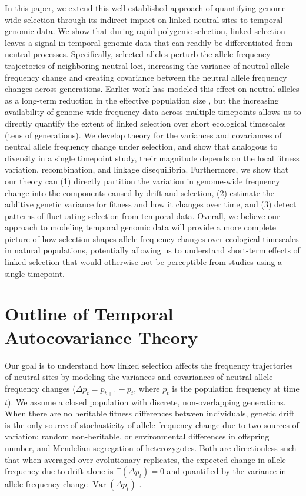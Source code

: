 \documentclass[11pt]{article}
\newcommand{\E}{\mathbb{E}}
\DeclareMathOperator{\var}{Var}
\begin{document}
In this paper, we extend this well-established approach of quantifying
genome-wide selection through its indirect impact on linked neutral sites to
temporal genomic data. We show that during rapid polygenic selection, linked
selection leaves a signal in temporal genomic data that can readily be
differentiated from neutral processes. Specifically, selected alleles perturb
the allele frequency trajectories of neighboring neutral loci, increasing the
variance of neutral allele frequency change and creating covariance between the
neutral allele frequency changes across generations.  Earlier work has modeled
this effect on neutral alleles as a long-term reduction in the effective
population size
\parencite{Robertson1961-ho,Santiago1995-hx,Santiago1998-bs,Wray1990-zf,J_A_Woolliams_N_R_Wray_R_Thompson2008-qo},
but the increasing availability of genome-wide frequency data across multiple
timepoints allows us to directly quantify the extent of linked selection over
short ecological timescales (tens of generations). We develop theory for the
variances and covariances of neutral allele frequency change under selection,
and show that analogous to diversity in a single timepoint study, their
magnitude depends on the local fitness variation, recombination, and linkage
disequilibria. Furthermore, we show that our theory can (1) directly
partition the variation in genome-wide frequency change into the components
caused by drift and selection, (2) estimate the additive genetic
variance for fitness and how it changes over time, and (3) detect patterns of
fluctuating selection from temporal data. Overall, we believe our approach to
modeling temporal genomic data will provide a more complete picture of how
selection shapes allele frequency changes over ecological timescales in natural
populations, potentially allowing us to understand short-term effects of linked
selection that would otherwise not be perceptible from studies using a single
timepoint. 

\section{Outline of Temporal Autocovariance Theory}
\label{sec:outline-temp}

Our goal is to understand how linked selection affects the frequency
trajectories of neutral sites by modeling the variances and covariances of
neutral allele frequency changes ($\Delta p_t = p_{t+1} - p_t$, where $p_t$ is
the population frequency at time $t$). We assume a closed population with
discrete, non-overlapping generations. When there are no heritable fitness
differences between individuals, genetic drift is the only source of
stochasticity of allele frequency change due to two sources of variation:
random non-heritable, or environmental differences in offspring number, and
Mendelian segregation of heterozygotes. Both are directionless such that when
averaged over evolutionary replicates, the expected change in allele frequency
due to drift alone is $\E(\Delta p_t) = 0$ and quantified by the variance in
allele frequency change $\var(\Delta p_t)$ \parencite[as quantified by the
variance effective population
size;][]{Wright1938-tv,Crow1970-wm,Charlesworth2009-sg}.
\end{document}
